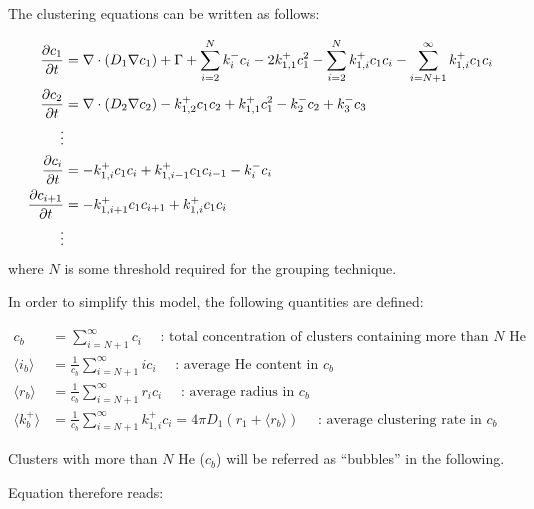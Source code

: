 The clustering equations can be written as follows:

\begin{subequations}
    \begin{align}
        \frac{\partial c_1}{\partial t} &= \nabla \cdot (D_1 \nabla c_1) + \Gamma + \sum\limits_{i=2}^N k_{i}^- c_i - 2k_{1, 1}^+ c_1^2 - \sum\limits_{i=2}^N k_{1,i}^+ c_1 c_i - \sum\limits_{i=N+1}^\infty k_{1,i}^+ c_1 c_i \\
        \frac{\partial c_2}{\partial t} &= \nabla \cdot (D_2 \nabla c_2) - k_{1, 2}^+ c_1 c_2 + k_{1, 1}^+ c_1^2 - k_{2}^- c_2 + k_{3}^- c_3\\
        \vdots \nonumber\\
        \frac{\partial c_i}{\partial t} &= - k_{1, i}^+ c_1 c_i + k_{1, i-1}^+ c_1 c_{i-1} - k_{i}^- c_i\\
        \frac{\partial c_{i+1}}{\partial t} &= - k_{1, i+1}^+ c_1 c_{i+1} + k_{1, i}^+ c_1 c_i\\
        \vdots \nonumber
    \end{align}
    \labeq{temporal evolution no grouping}
\end{subequations}
where $N$ is some threshold required for the grouping technique.

In order to simplify this model, the following quantities are defined:

\begin{align}
    c_b &= \sum\limits_{i=N+1}^\infty c_i \quad \text{ : total concentration of clusters containing more than $N$ He} \\
    \langle i_b \rangle &= \frac{1}{c_b} \sum\limits_{i=N+1}^\infty i c_i \quad \text{ : average He content in $c_b$} \\
    \langle r_b \rangle &=  \frac{1}{c_b}\sum\limits_{i=N+1}^\infty r_i c_i \quad \text{ : average radius in $c_b$}\\
    \langle k_b^+ \rangle &=  \frac{1}{c_b}\sum\limits_{i=N+1}^\infty k_{1,i}^+ c_i = 4 \pi D_1 (r_1 + \langle r_b \rangle) \quad \text{ : average clustering rate in $c_b$}
\end{align}

Clusters with more than $N$ \gls{He} ($c_b$) will be referred as ``bubbles'' in the following.

Equation  therefore reads:

